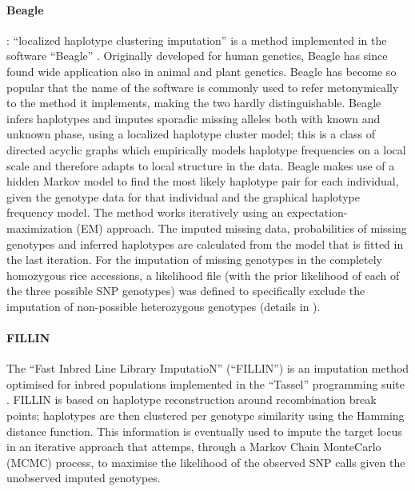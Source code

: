 \paragraph{Beagle}
\label{par:Beagle}
: ``localized haplotype clustering imputation'' is a method implemented in the software ``Beagle'' \cite{browning_rapid_2007}. Originally developed for human genetics, Beagle has since found wide application also in animal and plant genetics. Beagle has become so popular that the name of the software is commonly used  to refer metonymically to the method it implements, making the two hardly distinguishable. Beagle infers haplotypes and imputes sporadic missing alleles both with known and unknown phase, using a localized haplotype cluster model; this is a class of directed acyclic graphs which empirically models haplotype frequencies on a local scale and therefore adapts to local structure in the data. Beagle makes use of a hidden Markov model to find the most likely haplotype pair for each individual, given the genotype data for that individual and the graphical haplotype frequency model. The method works iteratively using an expectation-maximization (EM) approach. The imputed missing data, probabilities of missing genotypes and inferred haplotypes are calculated from the model that is fitted in the last iteration. For the imputation of missing genotypes in the completely homozygous rice accessions, a likelihood file (with the prior likelihood of each of the three possible SNP genotypes) was defined to specifically exclude the imputation of non-possible heterozygous genotypes (details in \cite{beagle3_manual}).

\paragraph{FILLIN}
The ``Fast Inbred Line Library ImputatioN'' (``FILLIN'') is an imputation method optimised for inbred populations implemented in the ``Tassel'' programming suite \cite{swarts_novel_2014}. FILLIN is based on haplotype reconstruction around recombination break points; haplotypes are then clustered per genotype similarity using the Hamming distance function. This information is eventually used to impute the target locus in an iterative approach that attemps, through a Markov Chain MonteCarlo (MCMC) process, to maximise the likelihood of the observed SNP calls given the unobserved imputed genotypes. 

